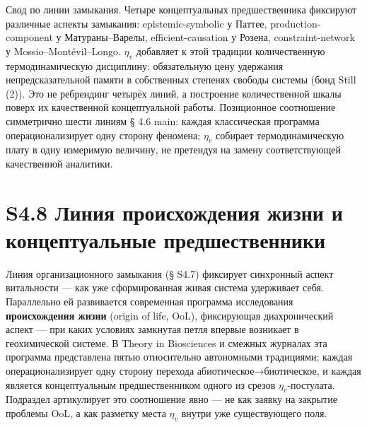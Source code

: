 \documentclass[pdflatex,sn-mathphys-ay]{sn-jnl}
\begin{document}
Свод по линии замыкания. Четыре концептуальных предшественника фиксируют различные аспекты замыкания: epistemic-symbolic у Паттее, production-component у Матураны--Варелы, efficient-causation у Розена, constraint-network у Mossio--Montévil--Longo. \(\eta_v\) добавляет к этой традиции количественную термодинамическую дисциплину: обязательную цену удержания непредсказательной памяти в собственных степенях свободы системы (бонд Still (2)). Это не ребрендинг четырёх линий, а построение количественной шкалы поверх их качественной концептуальной работы. Позиционное соотношение симметрично шести линиям § 4.6 main: каждая классическая программа операционализирует одну сторону феномена; \(\eta_v\) собирает термодинамическую плату в одну измеримую величину, не претендуя на замену соответствующей качественной аналитики.

\section*{S4.8 Линия происхождения жизни и концептуальные предшественники}\label{s4.8-ux43bux438ux43dux438ux44f-ux43fux440ux43eux438ux441ux445ux43eux436ux434ux435ux43dux438ux44f-ux436ux438ux437ux43dux438-ux438-ux43aux43eux43dux446ux435ux43fux442ux443ux430ux43bux44cux43dux44bux435-ux43fux440ux435ux434ux448ux435ux441ux442ux432ux435ux43dux43dux438ux43aux438}

Линия организационного замыкания (§ S4.7) фиксирует синхронный аспект витальности --- как уже сформированная живая система удерживает себя. Параллельно ей развивается современная программа исследования \textbf{происхождения жизни} (origin of life, OoL), фиксирующая диахронический аспект --- при каких условиях замкнутая петля впервые возникает в геохимической системе. В Theory in Biosciences и смежных журналах эта программа представлена пятью относительно автономными традициями; каждая операционализирует одну сторону перехода абиотическое→биотическое, и каждая является концептуальным предшественником одного из срезов \(\eta_v\)-постулата. Подраздел артикулирует это соотношение явно --- не как заявку на закрытие проблемы OoL, а как разметку места \(\eta_v\) внутри уже существующего поля.
\end{document}
